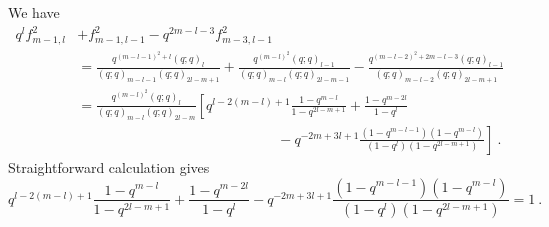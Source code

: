 \documentclass[a4paper,10pt]{article}
\newcommand{\C}{\mathds{C}}
\begin{document}
\begin{appendix}
We have 
\begin{equation}
\begin{split}
q^l f^{2}_{m-1,l} &+ f^{2}_{m-1,l-1}-q^{2m-l-3} f^{2}_{m-3,l-1}\\&=\frac{q^{(m-l-1)^2+l}(q;q)_{l}}{(q;q)_{m-l-1}(q;q)_{2l-m+1}}+ \frac{q^{(m-l)^2}(q;q)_{l-1}}{(q;q)_{m-l}(q;q)_{2l-m-1}}-\frac{q^{(m-l-2)^2+2m-l-3}(q;q)_{l-1}}{(q;q)_{m-l-2}(q;q)_{2l-m+1}}
\\&=\frac{q^{(m-l)^2}(q;q)_{l}}{(q;q)_{m-l}(q;q)_{2l-m}}\left[q^{l-2(m-l)+1}\frac{1-q^{m-l}}{1-q^{2l-m+1}}+\frac{1-q^{m-2l}}{1-q^l}\right.\\&\left.\hspace{6cm}-q^{-2m+3l+1}\frac{(1-q^{m-l-1})(1-q^{m-l})}{(1-q^l)(1-q^{2l-m+1})}\right]~.
\end{split}
\end{equation}
Straightforward calculation gives
\begin{equation}
q^{l-2(m-l)+1}\frac{1-q^{m-l}}{1-q^{2l-m+1}}+\frac{1-q^{m-2l}}{1-q^l}-q^{-2m+3l+1}\frac{(1-q^{m-l-1})(1-q^{m-l})}{(1-q^l)(1-q^{2l-m+1})}= 1~.   
\end{equation}
\end{appendix}



\end{document}
